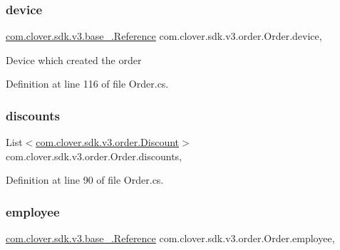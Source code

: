 \subsubsection{\texorpdfstring{device}{device}}
{\footnotesize\ttfamily \hyperlink{classcom_1_1clover_1_1sdk_1_1v3_1_1base___1_1_reference}{com.\+clover.\+sdk.\+v3.\+base\+\_\+.\+Reference} com.\+clover.\+sdk.\+v3.\+order.\+Order.\+device\hspace{0.3cm}{\ttfamily [get]}, {\ttfamily [set]}}



Device which created the order 



Definition at line 116 of file Order.\+cs.

\mbox{\label{classcom_1_1clover_1_1sdk_1_1v3_1_1order_1_1_order_af2da5f0ec5284218ad9f4ed2952cf227}} 
\subsubsection{\texorpdfstring{discounts}{discounts}}
{\footnotesize\ttfamily List$<$\hyperlink{classcom_1_1clover_1_1sdk_1_1v3_1_1order_1_1_discount}{com.\+clover.\+sdk.\+v3.\+order.\+Discount}$>$ com.\+clover.\+sdk.\+v3.\+order.\+Order.\+discounts\hspace{0.3cm}{\ttfamily [get]}, {\ttfamily [set]}}



Definition at line 90 of file Order.\+cs.

\mbox{\label{classcom_1_1clover_1_1sdk_1_1v3_1_1order_1_1_order_a4beff41200c929358225a79e7429b8c1}} 
\subsubsection{\texorpdfstring{employee}{employee}}
{\footnotesize\ttfamily \hyperlink{classcom_1_1clover_1_1sdk_1_1v3_1_1base___1_1_reference}{com.\+clover.\+sdk.\+v3.\+base\+\_\+.\+Reference} com.\+clover.\+sdk.\+v3.\+order.\+Order.\+employee\hspace{0.3cm}{\ttfamily [get]}, {\ttfamily [set]}}



